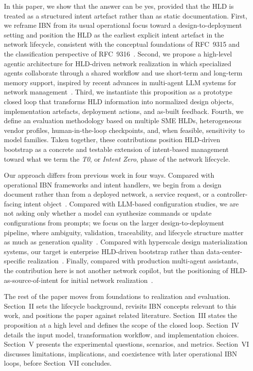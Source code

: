 \documentclass[conference]{IEEEtran}
\begin{document}
In this paper, we show that the answer can be yes, provided that the HLD is treated as a structured intent artefact rather than as static documentation. First, we reframe IBN from its usual operational focus toward a design-to-deployment setting and position the HLD as the earliest explicit intent artefact in the network lifecycle, consistent with the conceptual foundations of RFC~9315 and the classification perspective of RFC~9316~\cite{rfc9315,rfc9316}. Second, we propose a high-level agentic architecture for HLD-driven network realization in which specialized agents collaborate through a shared workflow and use short-term and long-term memory support, inspired by recent advances in multi-agent LLM systems for network management~\cite{wang2025intentdrivennetwork,tran2025multiagentcollaborationmechanismssurvey}. Third, we instantiate this proposition as a prototype closed loop that transforms HLD information into normalized design objects, implementation artefacts, deployment actions, and as-built feedback. Fourth, we define an evaluation methodology based on multiple SME HLDs, heterogeneous vendor profiles, human-in-the-loop checkpoints, and, when feasible, sensitivity to model families. Taken together, these contributions position HLD-driven bootstrap as a concrete and testable extension of intent-based management toward what we term the \emph{T0}, or \emph{Intent Zero}, phase of the network lifecycle.

Our approach differs from previous work in four ways. Compared with operational IBN frameworks and intent handlers, we begin from a design document rather than from a deployed network, a service request, or a controller-facing intent object~\cite{rfc9315,paul2025swift}. Compared with LLM-based configuration studies, we are not asking only whether a model can synthesize commands or update configurations from prompts; we focus on the larger design-to-deployment pipeline, where ambiguity, validation, traceability, and lifecycle structure matter as much as generation quality~\cite{wang2024netconfeval,han2025networkcopilot,mondal2025tackling}. Compared with hyperscale design materialization systems, our target is enterprise HLD-driven bootstrap rather than data-center-specific realization~\cite{jeffreyMALT20,cai2026matryoshka}. Finally, compared with production multi-agent assistants, the contribution here is not another network copilot, but the positioning of HLD-as-source-of-intent for initial network realization~\cite{wang2025intentdrivennetwork}.

The rest of the paper moves from foundations to realization and evaluation. Section~II sets the lifecycle background, revisits IBN concepts relevant to this work, and positions the paper against related literature. Section~III states the proposition at a high level and defines the scope of the closed loop. Section~IV details the input model, transformation workflow, and implementation choices. Section~V presents the experimental questions, scenarios, and metrics. Section~VI discusses limitations, implications, and coexistence with later operational IBN loops, before Section~VII concludes.
\end{document}
